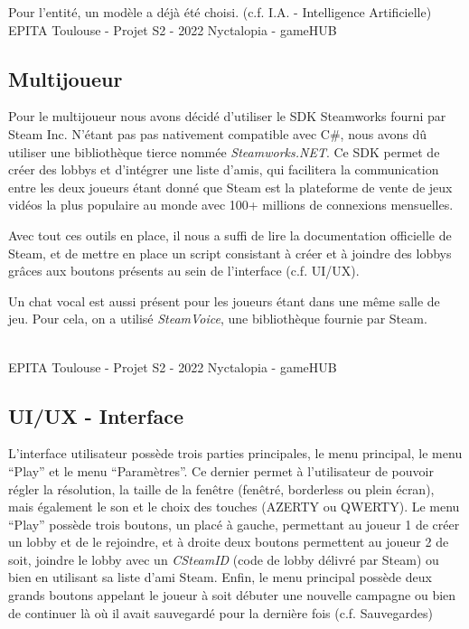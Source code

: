 Pour l'entité, un modèle a déjà été choisi. (c.f. I.A. - Intelligence Artificielle)
\vfill
\noindent\makebox[\linewidth]{\rule{.8\paperwidth}{.6pt}}\\[0.2cm]
EPITA Toulouse - Projet S2 - 2022 \hfill Nyctalopia - gameHUB
\noindent\makebox[\linewidth]{\rule{.8\paperwidth}{.6pt}}
\newpage



\subsection{Multijoueur}
\setlength{\parindent}{5ex}
Pour le multijoueur nous avons décidé d'utiliser le SDK Steamworks fourni par Steam Inc. N'étant pas pas nativement compatible avec C\#, nous avons dû utiliser une bibliothèque tierce nommée {\emph{Steamworks.NET}}. Ce SDK permet de créer des lobbys et d'intégrer une liste d'amis, qui facilitera la communication entre les deux joueurs étant donné que Steam est la plateforme de vente de jeux vidéos la plus populaire au monde avec 100+ millions de connexions mensuelles.

Avec tout ces outils en place, il nous a suffi de lire la documentation officielle de Steam, et de mettre en place un script consistant à créer et à joindre des lobbys grâces aux boutons présents au sein de l'interface (c.f. UI/UX).

Un chat vocal est aussi présent pour les joueurs étant dans une même salle de jeu. Pour cela, on a utilisé \emph{SteamVoice}, une bibliothèque fournie par Steam.

\vfill
\noindent\makebox[\linewidth]{\rule{.8\paperwidth}{.6pt}}\\[0.2cm]
EPITA Toulouse - Projet S2 - 2022 \hfill Nyctalopia - gameHUB
\noindent\makebox[\linewidth]{\rule{.8\paperwidth}{.6pt}}
\newpage

\subsection{UI/UX - Interface}
\setlength{\parindent}{5ex}
L'interface utilisateur possède trois parties principales, le menu principal, le menu ``Play'' et le menu ``Paramètres''. Ce dernier permet à l'utilisateur de pouvoir régler la résolution, la taille de la fenêtre (fenêtré, borderless ou plein écran), mais également le son et le choix des touches (AZERTY ou QWERTY).
Le menu ``Play'' possède trois boutons, un placé à gauche, permettant au joueur 1 de créer un lobby et de le rejoindre, et à droite deux boutons permettent au joueur 2 de soit, joindre le lobby avec un \emph{CSteamID} (code de lobby délivré par Steam) ou bien en utilisant sa liste d'ami Steam.
Enfin, le menu principal possède deux grands boutons appelant le joueur à soit débuter une nouvelle campagne ou bien de continuer là où il avait sauvegardé pour la dernière fois (c.f. Sauvegardes)

